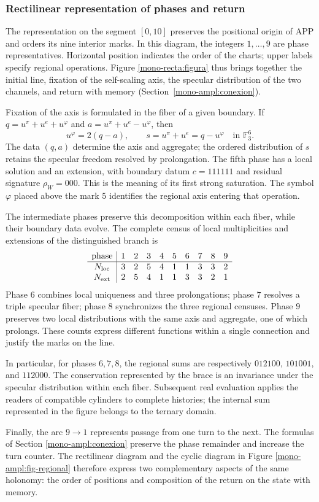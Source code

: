 \clearpage
\subsubsection{Rectilinear representation of phases and return}
\label{mono-recta:desarrollo}

The representation on the segment \([0,10]\) preserves the positional
origin of APP and orders its nine interior marks. In this diagram,
the integers \(1,\ldots,9\) are phase representatives. Horizontal
position indicates the order of the charts; upper labels
specify regional operations. Figure
\ref{mono-recta:figura} thus brings together the initial line, fixation of the
self-scaling axis, the specular distribution of the two channels, and
return with memory (Section~\ref{mono-ampl:conexion}).



Fixation of the axis is formulated in the fiber of a given boundary. If
\(q=u^\pi+u^e+u^\varphi\) and
\(a=u^\pi+u^e-u^\varphi\), then
\[
 u^\varphi=2(q-a),\qquad s=u^\pi+u^e=q-u^\varphi
 \quad\text{in }\mathbb F_3^6.
\]
The data \((q,a)\) determine the axis and aggregate; the ordered distribution
of \(s\) retains the specular freedom resolved by prolongation.
The fifth phase has a local solution and an extension, with boundary
datum \(c=111111\) and residual signature \(\rho_W=000\). This is the
meaning of its first strong saturation. The symbol \(\varphi\)
placed above the mark \(5\) identifies the regional axis entering
that operation.

The intermediate phases preserve this decomposition within each fiber,
while their boundary data evolve. The complete census of local
multiplicities and extensions of the distinguished branch is
\[
\begin{array}{c|rrrrrrrrr}
\text{phase}&1&2&3&4&5&6&7&8&9\\\hline
N_{\rm loc}&3&2&5&4&1&1&3&3&2\\
N_{\rm ext}&2&5&4&1&1&3&3&2&1
\end{array}
\]
Phase \(6\) combines local uniqueness and three prolongations; phase
\(7\) resolves a triple specular fiber; phase \(8\) synchronizes
the three regional censuses. Phase \(9\) preserves two local
distributions with the same axis and aggregate, one of which
prolongs. These counts express different functions within a
single connection and justify the marks on the line.

In particular, for phases \(6,7,8\), the regional sums are
respectively \(012100\), \(101001\), and \(112000\). The conservation
represented by the brace is an invariance under the specular
distribution within each fiber. Subsequent real evaluation applies the
readers of compatible cylinders to complete histories; the
internal sum represented in the figure belongs to the ternary domain.

Finally, the arc \(9\to1\) represents passage from one turn to the
next. The formulas of Section
\ref{mono-ampl:conexion} preserve the phase remainder and increase the
turn counter. The rectilinear diagram and the cyclic diagram in
Figure \ref{mono-ampl:fig-regional} therefore express two complementary
aspects of the same holonomy: the order of positions and
composition of the return on the state with memory.
